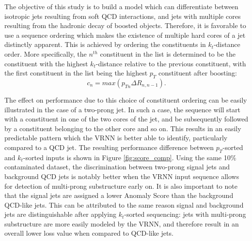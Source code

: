 \documentclass[11pt, a4paper]{article}
\begin{document}
The objective of this study is to build a model which can differentiate between isotropic jets resulting from soft QCD interactions, and jets with multiple cores resulting from the hadronic decay of boosted objects. Therefore, it is favorable to use a sequence ordering which makes the existence of multiple hard cores of a jet distinctly apparent. This is achieved by ordering the constituents in $k_{t}$-distance order. More specifically, the $n^{th}$ constituent in the list is determined to be the constituent with the highest $k_{t}$-distance relative to the previous constituent, with the first constituent in the list being the highest $p_{T}$ constituent after boosting:
\begin{equation}
	c_{n} = max(p_{Tn}\Delta R_{n, n-1}).
\end{equation}

The effect on performance due to this choice of constituent ordering can be easily illustrated in the case of a two-prong jet. In such a case, the sequence will start with a constituent in one of the two cores of the jet, and be subsequently followed by a constituent belonging to the other core and so on. This results in an easily predictable pattern which the VRNN is better able to identify, particularly compared to a QCD jet. The resulting performance difference between $p_{T}$-sorted and $k_{t}$-sorted inputs is shown in Figure \ref{fig:score_comp}. Using the same 10\% contaminated dataset, the discrimination between two-prong signal jets and background QCD jets is notably better when the VRNN input sequence allows for detection of multi-prong substructure early on. It is also important to note that the signal jets are assigned a lower Anomaly Score than the background QCD-like jets. This can be attributed to the same reason signal and background jets are distinguishable after applying $k_{t}$-sorted sequencing: jets with multi-prong substructure are more easily modeled by the VRNN, and therefore result in an overall lower loss value when compared to QCD-like jets. 
\end{document}
